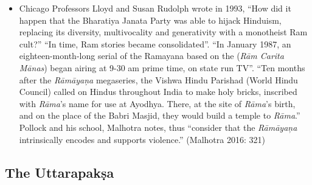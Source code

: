 \begin{itemize}
 \item Chicago Professors Lloyd and Susan Rudolph wrote in 1993, “How did it happen that the Bharatiya Janata Party was able to hijack Hinduism, replacing its diversity, multivocality and generativity with a monotheist Ram cult?” “In time, Ram stories became consolidated”. “In January 1987, an eighteen-month-long serial of the Ramayana based on the (\textit{Rām Carita Mānas}) began airing at 9-30 am prime time, on state run TV”. “Ten months after the \textit{Rāmāyaņa} megaseries, the Vishwa Hindu Parishad (World Hindu Council) called on Hindus throughout India to make holy bricks, inscribed with \textit{Rāma}’s name for use at Ayodhya. There, at the site of \textit{Rāma}’s birth, and on the place of the Babri Masjid, they would build a temple to \textit{Rāma}.” Pollock and his school, Malhotra notes, thus “consider that the \textit{Rāmāyaņa} intrinsically encodes and supports violence.” (Malhotra 2016: 321)

\end{itemize}


\subsection*{The Uttarapakṣa}


